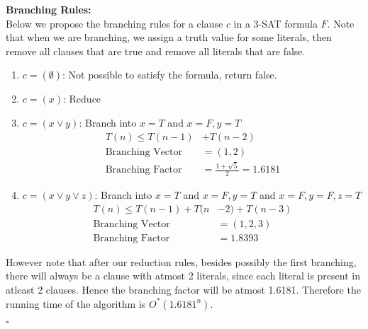 \documentclass{article}
\begin{document}
\noindent
\textbf{Branching Rules:} \\
Below we propose the branching rules for a clause $c$ in a 3-SAT formula $F$. Note that when we are branching, we assign a truth value for some literals, then remove all clauses that are true and remove all literals that are false.

\begin{enumerate}
    \item $c = (\emptyset)$: Not possible to satisfy the formula, return false.
    \item $c = (x)$: Reduce
    \item $c = (x \vee y)$: Branch into $x = T$ and $x = F, y = T$ 
    \vspace*{-1ex}
    \begin{align*}
        T(n) \le T(n - 1) &+ T(n - 2) \\
        \text{Branching Vector} &= (1, 2) \\
        \text{Branching Factor} &= \frac{1 + \sqrt{5}}{2} = 1.6181
    \end{align*}
    \item $c = (x \vee y \vee z)$: Branch into $x = T$ and $x = F, y = T$ and $x = F, y = F, z = T$
    \vspace*{-1ex}
    \begin{align*}
        T(n) \le T(n - 1) + T(n &- 2) + T(n - 3) \\
        \text{Branching Vector} &= (1, 2, 3) \\
        \text{Branching Factor} &= 1.8393
    \end{align*}
\end{enumerate}

However note that after our reduction rules, besides possibly the first branching, there will always be a clause with atmost 2 literals, since each literal is present in atleast 2 clauses. Hence the branching factor will be atmost 1.6181. Therefore the running time of the algorithm is $O^*(1.6181^n)$.

\hfill \ensuremath{\square} \\
\end{document}
